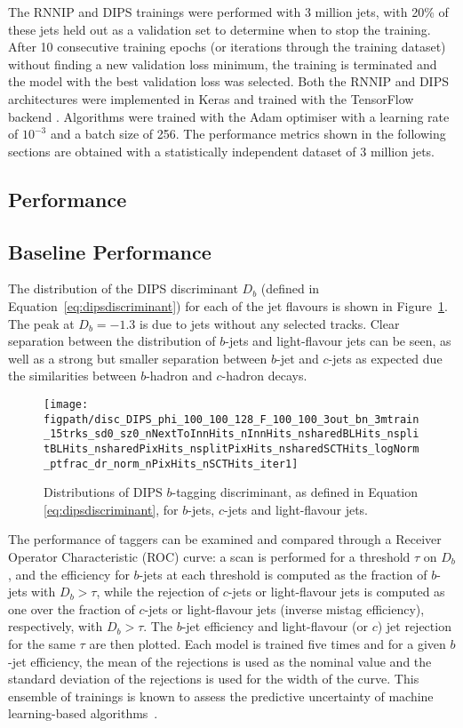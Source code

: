 The RNNIP and DIPS trainings were performed with 3 million jets, with 20\% of these jets held out as a validation set to determine when to stop the training. 
After 10 consecutive training epochs (or iterations through the training dataset) without finding a new validation loss minimum, the training is terminated and the model with the best validation loss was selected.  Both the RNNIP and DIPS architectures were implemented in Keras \cite{chollet2015keras} and trained with the TensorFlow backend \cite{tensorflow2015-whitepaper}. 
Algorithms were trained with the Adam optimiser \cite{kingma2014adam} with a learning rate of $10^{-3}$ and a batch size of 256. 
The performance metrics shown in the following sections are obtained with a statistically independent dataset of 3 million jets.

\subsection{Performance}

\subsection{Baseline Performance}
\label{subsec:baseline}

The distribution of the DIPS discriminant $D_b$ (defined in Equation~\ref{eq:dipsdiscriminant}) for each of the jet flavours is shown in Figure~\ref{fig:Db}. 
The peak at $D_b = -1.3$ is due to jets without any selected tracks. 
Clear separation between the distribution of $b$-jets and light-flavour jets can be seen, as well as a strong but smaller separation between $b$-jet and $c$-jets as expected due the similarities between $b$-hadron and $c$-hadron decays.

\begin{figure}[h!]
  \centering
  \texttt{[image: \\figpath/disc\_DIPS\_phi\_100\_100\_128\_F\_100\_100\_3out\_bn\_3mtrain\_15trks\_sd0\_sz0\_nNextToInnHits\_nInnHits\_nsharedBLHits\_nsplitBLHits\_nsharedPixHits\_nsplitPixHits\_nsharedSCTHits\_logNorm\_ptfrac\_dr\_norm\_nPixHits\_nSCTHits\_iter1]}
  \caption{Distributions of DIPS $b$-tagging discriminant, as defined in Equation \ref{eq:dipsdiscriminant}, for $b$-jets, $c$-jets and light-flavour jets.}
  \label{fig:Db}
\end{figure}

The performance of taggers can be examined and compared through a Receiver Operator Characteristic (ROC) curve: a scan is performed for a threshold $\tau$ on $D_b$, and the efficiency for $b$-jets at each threshold is computed as the fraction of $b$-jets with $D_b > \tau$, while the rejection of $c$-jets or light-flavour jets is computed as one over the fraction of $c$-jets or light-flavour jets (inverse mistag efficiency), respectively, with $D_b > \tau$. 
The $b$-jet efficiency and light-flavour (or $c$) jet rejection for the same $\tau$ are then plotted.  Each model is trained five times and for a given $b$-jet efficiency, the mean of the rejections is used as the nominal value and the standard deviation of the rejections is used for the width of the curve. 
This ensemble of trainings is known to assess the predictive uncertainty of machine learning-based algorithms~\cite{deepensembles}.

